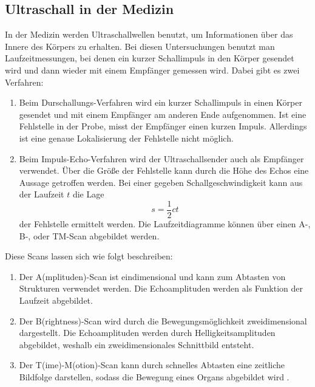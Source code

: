 \subsection{Ultraschall in der Medizin}
In der Medizin werden Ultraschallwellen benutzt, um Informationen über das Innere des Körpers zu erhalten. Bei diesen Untersuchungen benutzt man Laufzeitmessungen, bei denen ein kurzer Schallimpuls in den Körper gesendet wird und dann wieder mit einem Empfänger gemessen wird. Dabei gibt es zwei Verfahren:\\
\begin{enumerate}[nosep,label=\textsc{\arabic*},leftmargin=*]
\item Beim Durschallungs-Verfahren wird ein kurzer Schallimpuls in einen Körper gesendet und mit einem Empfänger am anderen Ende aufgenommen. Ist eine Fehlstelle in der Probe, misst der Empfänger einen kurzen Impuls. Allerdings ist eine genaue Lokalisierung der Fehlstelle nicht möglich.
\item Beim Impuls-Echo-Verfahren wird der Ultraschallsender auch als Empfänger verwendet. Über die Größe der Fehlstelle kann durch die Höhe des Echos  eine Aussage getroffen werden. Bei einer gegeben Schallgeschwindigkeit kann aus der Laufzeit $t$ die Lage
\begin{equation*}
  s=\frac{1}{2}ct
\end{equation*}
der Fehlstelle ermittelt werden. Die Laufzeitdiagramme können über einen A-, B-, oder TM-Scan abgebildet werden.
\end{enumerate}
Diese Scans lassen sich wie folgt beschreiben:
\begin{enumerate}[nosep,label=\textsc{\arabic*},leftmargin=*]
\item Der A(mplituden)-Scan ist eindimensional und kann zum Abtasten von Strukturen verwendet werden. Die Echoamplituden werden als Funktion der Laufzeit abgebildet.
\item Der B(rightness)-Scan wird durch die Bewegungsmöglichkeit zweidimensional dargestellt. Die Echoamplituden werden durch Helligkeitsamplituden abgebildet, weshalb ein zweidimensionales Schnittbild entsteht. 
\item Der T(ime)-M(otion)-Scan kann durch schnelles Abtasten eine zeitliche Bildfolge darstellen, sodass die Bewegung eines Organs abgebildet wird \cite{1}. 
\end{enumerate}
